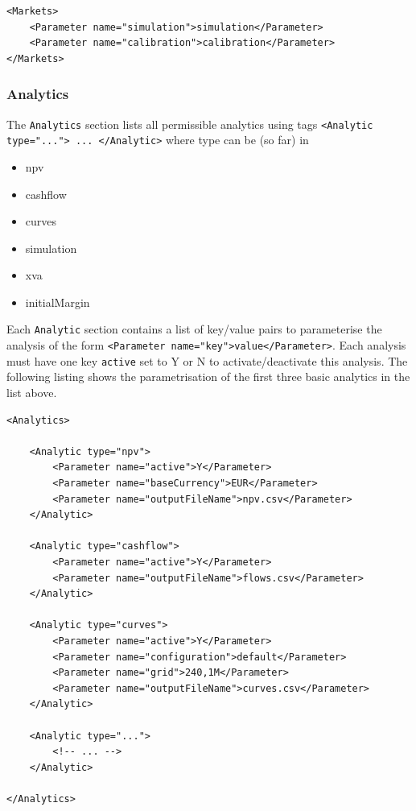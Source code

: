 \documentclass[12pt, a4paper]{article}
\begin{document}
\begin{lstlisting}[caption={ORE markets},
 	label=lst:ore_markets]
<Markets>
	<Parameter name="simulation">simulation</Parameter>
	<Parameter name="calibration">calibration</Parameter>
</Markets>
\end{lstlisting}

\subsubsection*{Analytics}

The {\tt Analytics} section lists all permissible analytics using tags {\tt <Analytic type="..."> ... </Analytic>} where type can be (so far) in
\begin{itemize}
\item npv
\item cashflow
\item curves
\item simulation
\item xva
\item initialMargin
\end{itemize}

Each {\tt Analytic} section contains a list of key/value pairs to parameterise the analysis of the form {\tt <Parameter name="key">value</Parameter>}. Each analysis
must have one key {\tt active} set to Y or N to activate/deactivate this analysis. 
The following listing shows the parametrisation of the first three basic analytics in the list above.

\begin{lstlisting}[caption={ORE analytics: npv, cashflow and curves},
 	label=lst:ore_analytics]
<Analytics>
    
	<Analytic type="npv">
		<Parameter name="active">Y</Parameter>
		<Parameter name="baseCurrency">EUR</Parameter>
		<Parameter name="outputFileName">npv.csv</Parameter>
	</Analytic>      

	<Analytic type="cashflow">
		<Parameter name="active">Y</Parameter>
		<Parameter name="outputFileName">flows.csv</Parameter>
	</Analytic>      

	<Analytic type="curves">
		<Parameter name="active">Y</Parameter>
		<Parameter name="configuration">default</Parameter>
		<Parameter name="grid">240,1M</Parameter>
		<Parameter name="outputFileName">curves.csv</Parameter>
	</Analytic>      

	<Analytic type="...">
		<!-- ... -->
	</Analytic>      

</Analytics>      
\end{lstlisting}
\end{document}
